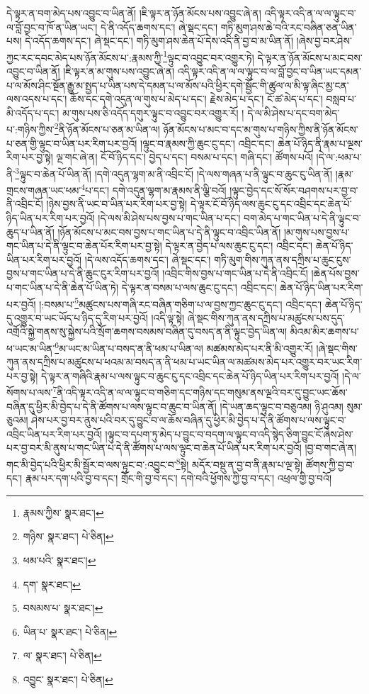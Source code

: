 དེ་ལྟར་ན་བག་མེད་པས་འབྱུང་བ་ཡིན་ནོ། །ཇི་ལྟར་ན་ཉོན་མོངས་པས་འབྱུང་ཞེ་ན། འདི་ལྟར་འདི་ན་ལ་ལ་ལྟུང་བ་ལ་བློ་བྱང་བ་ཁོ་ན་ཡིན་ཡང་། དེ་ནི་འདོད་ཆགས་དང་། ཞེ་སྡང་དང་། གཏི་མུག་ཤས་ཆེ་བའི་རང་བཞིན་ཅན་ཡིན་པས། དེ་འདོད་ཆགས་དང་། ཞེ་སྡང་དང་། གཏི་མུག་ཤས་ཆེན་པོ་དེས་འདི་ནི་བྱ་བ་མ་ཡིན་ནོ། །ཞེས་བྱ་བར་ཤེས་ཀྱང་རང་དབང་མེད་པས་ཉོན་མོངས་པ་:རྣམས་ཀྱི་\footnote{རྣམས་ཀྱིས་  སྣར་ཐང་། }ལྟུང་བ་འབྱུང་བར་འགྱུར་ཏེ། དེ་ལྟར་ན་ཉོན་མོངས་པ་མང་བས་འབྱུང་བ་ཡིན་ནོ། །ཇི་ལྟར་ན་མ་གུས་པས་འབྱུང་ཞེ་ན། འདི་ལྟར་འདི་ན་ལ་ལ་ལྟུང་བ་ལ་བློ་བྱང་བ་ཡིན་ཡང་དམན་པ་ལ་མོས་ཤིང་སྔོན་རྒྱུ་མ་སྤྱད་པ་ཡིན་པས་དེ་དམན་པ་ལ་མོས་པའི་ཕྱིར་དགེ་སྦྱོང་གི་ཚུལ་ལ་མི་ལྟ་ཞིང་མྱ་ངན་ལས་འདས་པ་དང་། ཆོས་དང་དགེ་འདུན་ལ་གུས་པ་མེད་པ་དང་། རྗེས་མེད་པ་དང་། ངོ་ཚ་མེད་པ་དང་། བསླབ་པ་མི་འདོད་པ་དང་། མ་གུས་པས་ཅི་འདོད་དགུར་ལྟུང་བ་འབྱུང་བར་འགྱུར་རོ། །
དེ་ལ་མི་ཤེས་པ་དང་བག་མེད་པ་:གཉིས་ཀྱིས་\footnote{གཉིས་  སྣར་ཐང་།  པེ་ཅིན། }ནི་ཉོན་མོངས་པ་ཅན་མ་ཡིན་ལ། ཉོན་མོངས་པ་མང་བ་དང་མ་གུས་པ་གཉིས་ཀྱིས་ནི་ཉོན་མོངས་པ་ཅན་གྱི་ལྟུང་བ་ཡིན་པར་རིག་པར་བྱའོ། །ལྟུང་བ་རྣམས་ཀྱི་ཆུང་ངུ་དང་། འབྲིང་དང་། ཆེན་པོ་ཉིད་ནི་རྣམ་པ་ལྔས་རིག་པར་བྱ་སྟེ། ལྔ་གང་ཞེ་ན། ངོ་བོ་ཉིད་དང་། བྱེད་པ་དང་། བསམ་པ་དང་། གཞི་དང་། ཚོགས་པའོ། །དེ་ལ་:ཕམ་པ་ནི་\footnote{ཕམ་པའི་  སྣར་ཐང་། }ལྟུང་བ་ཆེན་པོ་ཡིན་ནོ། །དགེ་འདུན་ལྷག་མ་ནི་འབྲིང་ངོ། །དེ་ལས་གཞན་པ་ནི་ལྟུང་བ་ཆུང་ངུ་ཡིན་ནོ། །རྣམ་གྲངས་གཞན་ཡང་ཕམ་\footnote{དག་  སྣར་ཐང་། }པ་དང་། དགེ་འདུན་ལྷག་མ་རྣམས་ནི་ལྕི་བའོ། །ལྟུང་བྱེད་དང་སོ་སོར་བཤགས་པར་བྱ་བ་ནི་འབྲིང་ངོ། །ཉེས་བྱས་ནི་ཡང་བ་ཡིན་པར་རིག་པར་བྱ་སྟེ། དེ་ལྟར་ངོ་བོ་ཉིད་ལས་ཆུང་ངུ་དང་འབྲིང་དང་ཆེན་པོ་ཉིད་ཡིན་པར་རིག་པར་བྱའོ། །དེ་ལས་མི་ཤེས་པས་བྱས་པ་གང་ཡིན་པ་དང་། བག་མེད་པ་གང་ཡིན་པ་དེ་ནི་ལྟུང་བ་ཆུད་པ་ཡིན་ནོ། །ཉོན་མོངས་པ་མང་བས་བྱས་པ་གང་ཡིན་པ་དེ་ནི་ལྟུང་བ་འབྲིང་ཡིན་ནོ། །མ་གུས་པས་བྱས་པ་གང་ཡིན་པ་དེ་ནི་ལྟུང་བ་ཆེན་པོར་རིག་པར་བྱ་སྟེ། དེ་ལྟར་ན་བྱེད་པ་ལས་ཆུང་ངུ་དང་། འབྲིང་དང་། ཆེན་པོ་ཉིད་ཡིན་པར་རིག་པར་བྱའོ། །དེ་ལས་འདོད་ཆགས་དང་། ཞེ་སྡང་དང་། གཏི་མུག་གིས་ཀུན་ནས་དཀྲིས་པ་ཆུང་ངུས་བྱས་པ་གང་ཡིན་པ་དེ་ནི་ཆུང་ངུར་རིག་པར་བྱའོ། །འབྲིང་གིས་བྱས་པ་གང་ཡིན་པ་དེ་ནི་འབྲིང་ངོ། །ཆེན་པོས་བྱས་པ་གང་ཡིན་པ་དེ་ནི་ཆེན་པོ་ཡིན་ཏེ། དེ་ལྟར་ན་བསམ་པ་ལས་ཆུང་ངུ་དང་། འབྲིང་དང་། ཆེན་པོ་ཉིད་ཡིན་པར་རིག་པར་བྱའོ། །:བསམ་པ་\footnote{བསམས་པ་  སྣར་ཐང་། }མཚུངས་པས་གཞི་རང་བཞིན་གཅིག་པ་ལ་བྱས་ཀྱང་ཆུང་ངུ་དང་། འབྲིང་དང་། ཆེན་པོ་ཉིད་དུ་འགྱུར་བ་ཡང་ཡོད་པ་ཉིད་དུ་རིག་པར་བྱའོ། །འདི་ལྟ་སྟེ། ཞེ་སྡང་གིས་ཀུན་ནས་དཀྲིས་པ་མཚུངས་པས་དུད་འགྲོའི་སྐྱེ་གནས་སུ་སྐྱེས་པའི་སྲོག་ཆགས་བསམས་བཞིན་དུ་བསད་ན་ནི་ལྟུང་བྱེད་ཡིན་ལ། མིའམ་མིར་ཆགས་པ་ཕ་ཡང་མ་ཡིན་\footnote{ཡིན་པ་  སྣར་ཐང་།  པེ་ཅིན། }མ་ཡང་མ་ཡིན་པ་བསད་ན་ནི་ཕམ་པ་ཡིན་ལ། མཚམས་མེད་པར་ནི་མི་འགྱུར་རོ། །ཞེ་སྡང་གིས་ཀུན་ནས་དཀྲིས་པ་མཚུངས་པ་ཕའམ་མ་བསད་ན་ནི་ཕམ་པ་ཡང་ཡིན་ལ་མཚམས་མེད་པར་འགྱུར་བར་ཡང་རིག་པར་བྱ་སྟེ། དེ་ལྟར་ན་གཞིའི་རྣམ་པ་ལས་ལྟུང་བ་ཆུང་ངུ་དང་འབྲིང་དང་ཆེན་པོ་ཉིད་ཡིན་པར་རིག་པར་བྱའོ། །དེ་ལ་སོགས་པ་ལས་\footnote{ལ་  སྣར་ཐང་།  པེ་ཅིན། }ནི་འདི་ལྟར་འདི་ན་ལ་ལ་ལྟུང་བ་གཅིག་དང་གཉིས་དང་གསུམ་ནས་ལྔའི་བར་དུ་བྱུང་ཡང་ཆོས་བཞིན་དུ་ཕྱིར་མི་བྱེད་པ་དེ་ནི་ཚོགས་པ་ལས་ལྟུང་བ་ཆུང་བ་ཡིན་ནོ། །དེ་ཡན་ཆད་ལྟུང་བ་བཅུའམ། ཉི་ཤུའམ། སུམ་ཅུའམ། ཤེས་པར་བྱ་བར་ནུས་པའི་བར་དུ་བྱུང་བ་ལ་ཆོས་བཞིན་དུ་ཕྱིར་མི་བྱེད་པ་དེ་ནི་ཚོགས་པ་ལས་ལྟུང་བ་འབྲིང་ཡིན་པར་རིག་པར་བྱའོ། །ལྟུང་བ་དཔག་ཏུ་མེད་པ་བྱུང་བ་བདག་ལ་ལྟུང་བ་འདི་སྙེད་ཅིག་བྱུང་ངོ་ཞེས་ཤེས་པར་བྱ་བར་མི་ནུས་པ་གང་ཡིན་པ་དེ་ནི་ཚོགས་པ་ལས་ལྟུང་བ་ཆེན་པོ་ཡིན་པར་རིག་པར་བྱའོ། །བྱ་བ་གང་ཞེ་ན། གང་མི་བྱེད་པའི་ཕྱིར་མི་སྦྱོར་བ་ལས་ལྟུང་བ་:འབྱུང་བ་\footnote{འབྱུང་  སྣར་ཐང་།  པེ་ཅིན། }སྟེ། མདོར་བསྡུ་ན་བྱ་བ་ནི་རྣམ་པ་ལྔ་སྟེ། ཚོགས་ཀྱི་བྱ་བ་དང་། རྣམ་པར་དག་པའི་བྱ་བ་དང་། གྲོང་གི་བྱ་བ་དང་། དགེ་བའི་ཕྱོགས་ཀྱི་བྱ་བ་དང་། འཕྲལ་གྱི་བྱ་བའོ། 